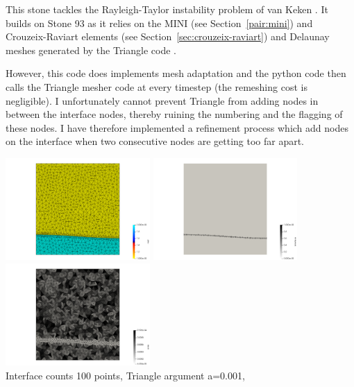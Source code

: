

This stone tackles the Rayleigh-Taylor instability problem of van Keken \etal \cite{vaks97}. 
It builds on Stone 93 as it relies on the MINI (see Section~\ref{pair:mini}) 
and Crouzeix-Raviart elements (see Section~\ref{sec:crouzeix-raviart}) and Delaunay meshes
generated by the Triangle code \cite{shew14}.  

However, this code does implements mesh adaptation and the python code then calls the Triangle mesher code
at every timestep (the remeshing cost is negligible).
I unfortunately cannot prevent Triangle from adding nodes in between the interface nodes, thereby 
ruining the numbering and the flagging of these nodes. I have therefore implemented a refinement 
process which add nodes on the interface when two consecutive nodes are getting too far apart. 


\begin{center}
\includegraphics[width=5.5cm]{python_codes/fieldstone_95/init/mat}
\includegraphics[width=5.5cm]{python_codes/fieldstone_95/init/interface}
\includegraphics[width=5.5cm]{python_codes/fieldstone_95/init/area}\\
{\captionfont Interface counts 100 points, Triangle argument a=0.001, } 
\end{center}

